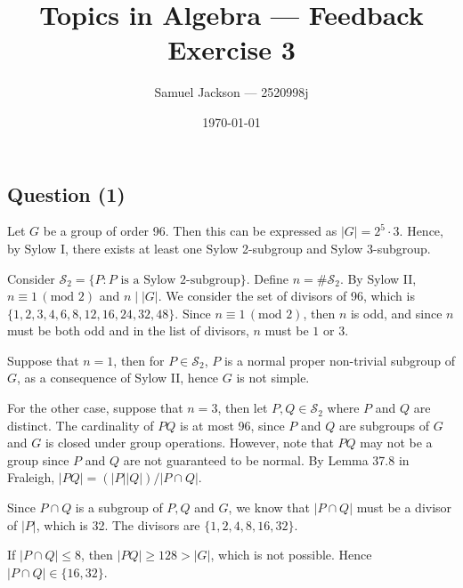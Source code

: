 \documentclass{article}
\title{Topics in Algebra  --- Feedback Exercise 3}
\author{Samuel Jackson --- 2520998j}
\date{\today}
\begin{document}
\newcommand{\order}[1]{|#1|}
\newcommand{\setS}{\mathcal{S}}
\newcommand{\norm}{\trianglelefteq}

\maketitle

\begin{center}
\section*{Question (1)}
\end{center}

\begin{flushleft}
    Let $G$ be a group of order 96. Then this can be expressed as $\order{G} = 2^5 \cdot 3$. Hence, by Sylow I, there exists at least one Sylow 2-subgroup and Sylow 3-subgroup. \newline

    Consider $\setS_2 = \{ P : P \text{ is a Sylow 2-subgroup}\}$. Define $n = \#\setS_2$. By Sylow II, $n \equiv 1 \, (\text{mod } 2)$ and $n \mid \order{G}$. We consider the set of divisors of 96, which is $\{1, 2, 3, 4, 6, 8, 12, 16, 24, 32, 48\}$. Since $n \equiv 1 \, (\text{mod } 2)$, then $n$ is odd, and since $n$ must be both odd and in the list of divisors, $n$ must be $1$ or $3$. \newline 

    Suppose that $n = 1$, then for $P \in \setS_2$, $P$ is a normal proper non-trivial subgroup of $G$, as a consequence of Sylow II, hence $G$ is not simple. \newline
    
    For the other case, suppose that $n = 3$, then let $P, Q \in \setS_2$ where $P$ and $Q$ are distinct. The cardinality of $PQ$ is at most 96, since $P$ and $Q$ are subgroups of $G$ and $G$ is closed under group operations. However, note that $PQ$ may not be a group since $P$ and $Q$ are not guaranteed to be normal. By Lemma 37.8 in Fraleigh, $\order{PQ} = (\order{P}\order{Q}) / \order{P \cap Q}$. \newline 
    
    Since $P \cap Q$ is a subgroup of $P, Q$ and $G$, we know that $\order{P \cap Q}$ must be a divisor of $\order{P}$, which is 32. The divisors are $\{1, 2, 4, 8, 16, 32\}$. \newline 
    
    If $\order{P \cap Q} \leq 8$, then $\order{PQ} \geq 128 > \order{G}$, which is not possible. Hence $\order{P \cap Q} \in \{16, 32\}$. \newline


\end{flushleft}
\end{document}
